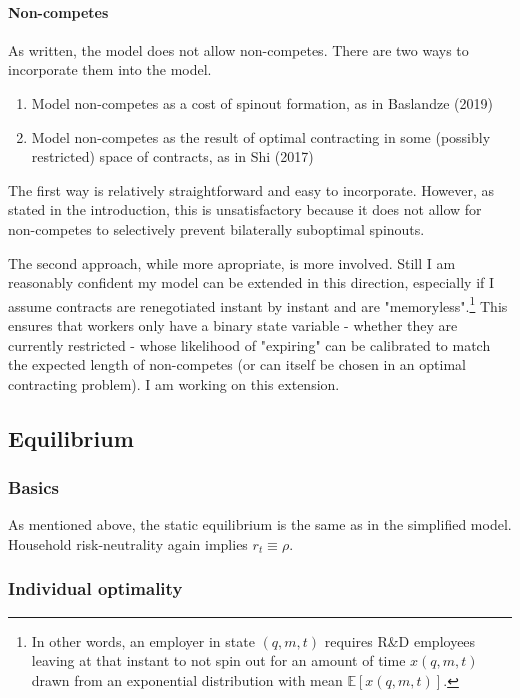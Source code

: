 \documentclass[11pt,english]{article}
\theoremstyle{remark}
\begin{document}
\paragraph{Non-competes}

As written, the model does not allow non-competes. There are two ways to incorporate them into the model.
\begin{enumerate}
	\item Model non-competes as a cost of spinout formation, as in Baslandze (2019)
	\item Model non-competes as the result of optimal contracting in some (possibly restricted) space of contracts, as in Shi (2017)
\end{enumerate}

The first way is relatively straightforward and easy to incorporate. However, as stated in the introduction, this is unsatisfactory because it does not allow for non-competes to selectively prevent bilaterally suboptimal spinouts. 

The second approach, while more apropriate, is more involved. Still I am reasonably confident my model can be extended in this direction, especially if I assume contracts are renegotiated instant by instant and are "memoryless".\footnote{In other words, an employer in state $(q,m,t)$ requires R\&D employees leaving at that instant to not spin out for an amount of time $x(q,m,t)$ drawn from an exponential distribution with mean $\mathbb{E}[x(q,m,t)]$.} This ensures that workers only have a binary state variable - whether they are currently restricted - whose likelihood of "expiring" can be calibrated to match the expected length of non-competes (or can itself be chosen in an optimal contracting problem). I am working on this extension.


\subsection{Equilibrium}

\subsubsection{Basics}

As mentioned above, the static equilibrium is the same as in the simplified model. Household risk-neutrality again implies $r_t \equiv \rho$. 

\subsubsection{Individual optimality}
\end{document}
